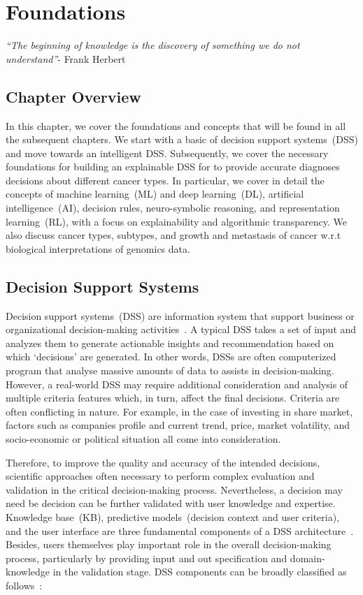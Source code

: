 \chapter{Foundations}
\label{chapter:preli}
\textit{``The beginning of knowledge is the discovery of something we do not understand''}- Frank Herbert 

\section{Chapter Overview}
In this chapter, we cover the foundations and concepts that will be found in all the subsequent chapters. We start with a basic of decision support systems~(DSS) and move towards an intelligent DSS. Subsequently, we cover the necessary foundations for building an explainable DSS for to provide accurate diagnoses decisions about different cancer types. In particular, we cover in detail the concepts of machine learning~(ML) and deep learning~(DL), artificial intelligence~(AI), decision rules, neuro-symbolic reasoning, and representation learning~(RL), with a focus on explainability and algorithmic transparency. We also discuss cancer types, subtypes, and growth and metastasis of cancer w.r.t biological interpretations of genomics data. 

\section{Decision Support Systems}\label{sec:DSS}
Decision support systems~(DSS) are information system that support business or organizational decision-making activities~\cite{hackathorn1981organizational}. A typical DSS takes a set of input and analyzes them to generate actionable insights and recommendation based on which `decisions' are generated. 
In other words, DSSs are often computerized program that analyse massive amounts of data to assists in decision-making. 
However, a real-world DSS may require additional consideration and analysis of multiple criteria features which, in turn, affect the final decisions.  Criteria are often conflicting in nature. For example, in the case of investing in share market, factors such as companies profile and current trend, price, market volatility, and socio-economic or political situation all come into consideration. 

\hspace*{3.5mm} Therefore, to improve the quality and accuracy of the intended decisions, scientific approaches often necessary to perform complex evaluation and validation in the critical decision-making process. Nevertheless, a decision may need be decision can be further validated with user knowledge and expertise. Knowledge base~(KB), predictive models~(decision context and user criteria), and the user interface are three fundamental components of a DSS architecture~\cite{hackathorn1981organizational}. Besides, users themselves play important role in the overall decision-making process, particularly by providing input and out specification and domain-knowledge in the validation stage. DSS components can be broadly classified as follows~\cite{hackathorn1981organizational}: 

